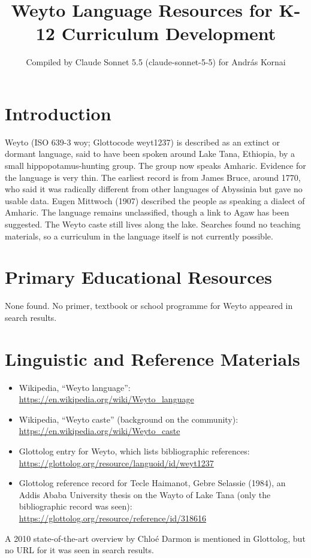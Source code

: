 \documentclass[12pt]{article}
\title{Weyto Language Resources for K-12 Curriculum Development}
\author{Compiled by Claude Sonnet 5.5 (claude-sonnet-5-5) for Andr\'as Kornai}
\date{}
\begin{document}
\maketitle

\section{Introduction}
Weyto (ISO 639-3 woy; Glottocode weyt1237) is described as an extinct or dormant language, said to have been spoken around Lake Tana, Ethiopia, by a small hippopotamus-hunting group. The group now speaks Amharic. Evidence for the language is very thin. The earliest record is from James Bruce, around 1770, who said it was radically different from other languages of Abyssinia but gave no usable data. Eugen Mittwoch (1907) described the people as speaking a dialect of Amharic. The language remains unclassified, though a link to Agaw has been suggested. The Weyto caste still lives along the lake. Searches found no teaching materials, so a curriculum in the language itself is not currently possible.

\section{Primary Educational Resources}
None found. No primer, textbook or school programme for Weyto appeared in search results.

\section{Linguistic and Reference Materials}
\begin{itemize}
\item Wikipedia, ``Weyto language'': \url{https://en.wikipedia.org/wiki/Weyto_language}
\item Wikipedia, ``Weyto caste'' (background on the community): \url{https://en.wikipedia.org/wiki/Weyto_caste}
\item Glottolog entry for Weyto, which lists bibliographic references: \url{https://glottolog.org/resource/languoid/id/weyt1237}
\item Glottolog reference record for Tecle Haimanot, Gebre Selassie (1984), an Addis Ababa University thesis on the Wayto of Lake Tana (only the bibliographic record was seen): \url{https://glottolog.org/resource/reference/id/318616}
\end{itemize}
A 2010 state-of-the-art overview by Chlo\'e Darmon is mentioned in Glottolog, but no URL for it was seen in search results.
\end{document}
